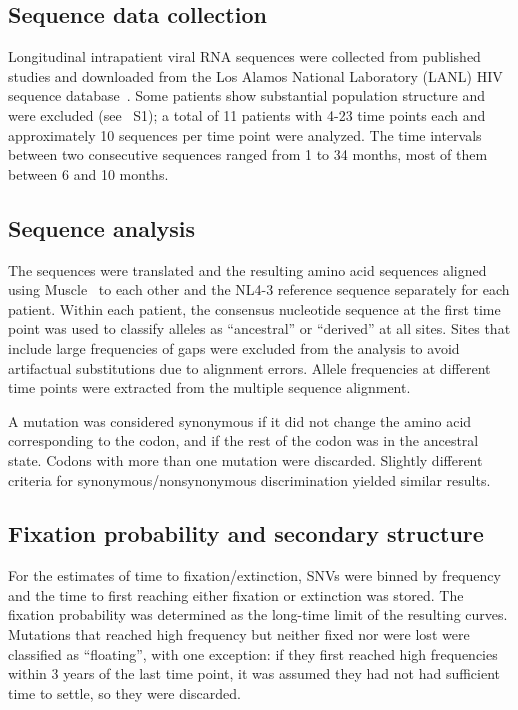 \documentclass[rmp, twocolumn]{revtex4}
\newcommand{\PCApat}{1}
\begin{document}
\subsection*{Sequence data collection}
Longitudinal intrapatient viral RNA sequences were collected from published
studies \citep{shankarappa_consistent_1999, liu_selection_2006,
bunnik_autologous_2008} and downloaded from the Los Alamos National Laboratory
(LANL) HIV sequence database~\citep{LANL2012}. Some patients
show substantial population structure and were excluded (see
\figurename~S\PCApat); a total of 11 patients with 4-23 time points each and
approximately 10 sequences per time point were analyzed. The time intervals
between two consecutive sequences ranged from 1 to 34 months, most of them
between 6 and 10 months.

\subsection*{Sequence analysis}
The sequences were translated and the resulting amino acid sequences aligned
using Muscle~\citep{edgar_muscle:_2004} to each other and the NL4-3 reference
sequence separately for each patient. Within each patient, the consensus
nucleotide sequence at the first time point was used to classify alleles as
``ancestral'' or ``derived'' at all sites. Sites that include large
frequencies of gaps were excluded from the analysis to avoid artifactual
substitutions due to alignment errors. Allele frequencies at different time
points were extracted from the multiple sequence alignment.

A mutation was considered synonymous if it did not change the amino acid
corresponding to the codon, and if the rest of the codon was in the ancestral
state. Codons with more than one mutation were discarded. Slightly different
criteria for synonymous/nonsynonymous discrimination yielded similar results.

\subsection*{Fixation probability and secondary structure}
For the estimates of time to fixation/extinction, SNVs were binned by
frequency and the time to first reaching either fixation or extinction was
stored. The fixation probability was determined as the long-time limit of the
resulting curves. Mutations that reached high frequency but neither fixed nor
were lost were classified as ``floating'', with one exception: if they first
reached high frequencies within 3 years of the last time point, it was assumed
they had not had sufficient time to settle, so they were discarded.
\end{document}
